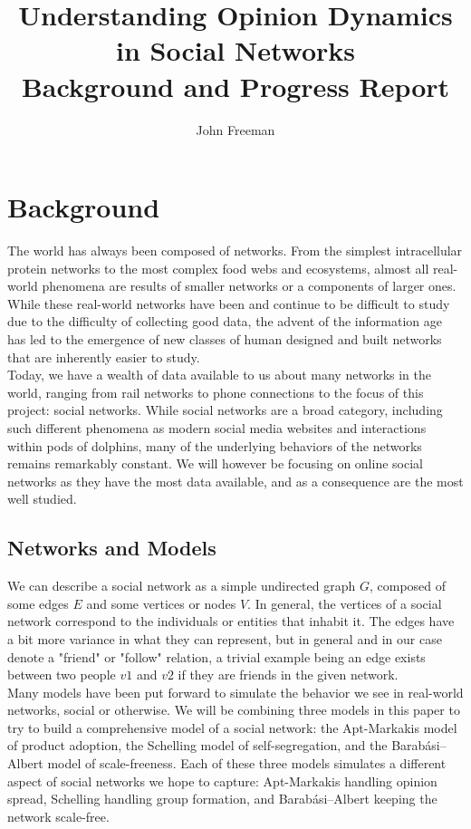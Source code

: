 \documentclass[10pt]{article}
\title{Understanding Opinion Dynamics in Social Networks\\
		Background and Progress Report}
\author{John Freeman}
\begin{document}
\maketitle
\pagebreak
\tableofcontents
\pagebreak

\section{Background} 

The world has always been composed of networks. From the simplest intracellular protein networks to the most complex food webs and ecosystems, almost all real-world phenomena are results of smaller networks or a components of larger ones. While these real-world networks have been and continue to be difficult to study due to the difficulty of collecting good data, the advent of the information age has led to the emergence of new classes of human designed and built networks that are inherently easier to study. \\

Today, we have a wealth of data available to us about many networks in the world, ranging from rail networks to phone connections to the focus of this project: social networks. While social networks are a broad category, including such different phenomena as modern social media websites and interactions within pods of dolphins, many of the underlying behaviors of the networks remains remarkably constant. We will however be focusing on online social networks as they have the most data available, and as a consequence are the most well studied. \\

\subsection{Networks and Models} 

We can describe a social network as a simple undirected graph $G$, composed of some edges $E$ and some vertices or nodes $V$. In general, the vertices of a social network correspond to the individuals or entities that inhabit it. The edges have a bit more variance in what they can represent, but in general and in our case denote a "friend" or "follow" relation, a trivial example being an edge exists between two people $v1$ and $v2$ if they are friends in the given network. \\

Many models have been put forward to simulate the behavior we see in real-world networks, social or otherwise. We will be combining three models in this paper to try to build a comprehensive model of a social network: the Apt-Markakis model of product adoption, the Schelling model of self-segregation, and the Barabási–Albert model of scale-freeness. Each of these three models simulates a different aspect of social networks we hope to capture: Apt-Markakis handling opinion spread, Schelling handling group formation, and Barabási–Albert keeping the network scale-free. \\
\end{document}

